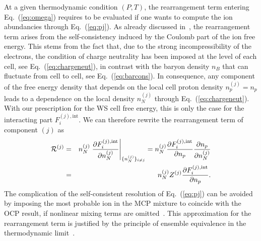 At a given thermodynamic condition $(P,T)$, the rearrangement term entering 
Eq.~(\ref{eq:omega}) requires to be evaluated if one wants to compute the ion 
abundancies through Eq.~(\ref{eq:pj}).
As already discussed in~\cite{Fantina2020}, the rearrangement term arises from 
the self-consistency induced by the Coulomb part of the ion free energy. This 
stems from the fact that, due to the strong incompressibility of the electrons, 
the condition of charge neutrality has been imposed at the level of each cell, 
see Eq.~(\ref{eq:chargeneut}), in contrast with the baryon density $n_B$ that 
can fluctuate from cell to cell, see Eq.~(\ref{eq:barcons}). 
In consequence, any component of the free energy density that depends on the 
local cell proton density $n_p^{(j)} = n_p$ leads to a dependence on the local 
density $n_N^{(j)}$ through Eq.~(\ref{eq:chargeneut}). With our prescription 
for the WS cell free energy, this is only the case for the interacting part 
$F_i^{(j),\text{int}}$. We can therefore rewrite the rearrangement term of 
component $(j)$ as
%
\begin{eqnarray}
  \mathcal{R}^{(j)} 
  &=& n_N^{(j)} \left.\frac{\partial F_i^{(j),\text{int}}}{\partial
    n_N^{(j)}}\right|_{\{n_N^{(j)}\}_{i\neq j}}
    = n_N^{(j)} \frac{\partial F_i^{(j),\text{int}}}{\partial n_p}
    \frac{\partial n_p}{\partial n_N^{(j)}}\notag\\
  &=& n_N^{(j)} Z^{(j)} \frac{\partial F_i^{(j),\text{int}}}{\partial n_p}.
\end{eqnarray}
%
The complication of the self-consistent resolution of Eq.~(\ref{eq:pj}) can be 
avoided by imposing the most probable ion in the MCP mixture to coincide with 
the OCP result, if nonlinear mixing terms are omitted~\cite{Grams2018}. 
This approximation for the rearrangement term is justified by the principle of 
ensemble equivalence in the thermodynamic limit~\cite{Gulminelli2015}.

